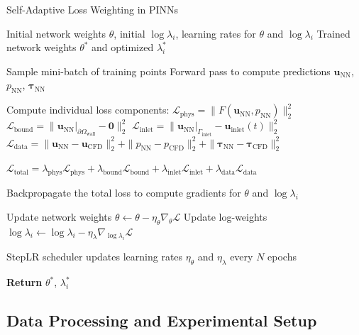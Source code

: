 \documentclass{article}
\begin{document}
\begin{algorithm}[htbp]
    \caption{Self-Adaptive Loss Weighting in PINNs}
    \label{alg:self_adaptive_weighting}
    \begin{algorithmic}[1]
    \Require Initial network weights $\theta$, initial $\log \lambda_i$, learning rates for $\theta$ and $\log \lambda_i$
    \Ensure Trained network weights $\theta^*$ and optimized $\lambda_i^*$
    
        \State Sample mini-batch of training points
        \State Forward pass to compute predictions $\mathbf{u}_{\mathrm{NN}}$, $p_{\mathrm{NN}}$, $\boldsymbol{\tau}_{\mathrm{NN}}$
        
        \State Compute individual loss components:
            \State \quad $\mathcal{L}_{\mathrm{phys}} = \|F(\mathbf{u}_{\mathrm{NN}}, p_{\mathrm{NN}})\|_2^2$
            \State \quad $\mathcal{L}_{\mathrm{bound}} = \|\mathbf{u}_{\mathrm{NN}}|_{\partial\Omega_{\mathrm{wall}}} - \mathbf{0}\|_2^2$
            \State \quad $\mathcal{L}_{\mathrm{inlet}} = \|\mathbf{u}_{\mathrm{NN}}|_{\Gamma_{\mathrm{inlet}}} - \mathbf{u}_{\mathrm{inlet}}(t)\|_2^2$
            \State \quad $\mathcal{L}_{\mathrm{data}} = \|\mathbf{u}_{\mathrm{NN}} - \mathbf{u}_{\mathrm{CFD}}\|_2^2 + \|p_{\mathrm{NN}} - p_{\mathrm{CFD}}\|_2^2 + \|\boldsymbol{\tau}_{\mathrm{NN}} - \boldsymbol{\tau}_{\mathrm{CFD}}\|_2^2$
        
        \State \quad $\mathcal{L}_{\mathrm{total}} = \lambda_{\mathrm{phys}} \mathcal{L}_{\mathrm{phys}} + \lambda_{\mathrm{bound}} \mathcal{L}_{\mathrm{bound}} + \lambda_{\mathrm{inlet}} \mathcal{L}_{\mathrm{inlet}} + \lambda_{\mathrm{data}} \mathcal{L}_{\mathrm{data}}$
        
        \State Backpropagate the total loss to compute gradients for $\theta$ and $\log \lambda_i$
        
        \State Update network weights $\theta \gets \theta - \eta_{\theta} \nabla_{\theta} \mathcal{L}$
        \State Update log-weights $\log \lambda_i \gets \log \lambda_i - \eta_{\lambda} \nabla_{\log \lambda_i} \mathcal{L}$
        
        \State StepLR scheduler updates learning rates $\eta_{\theta}$ and $\eta_{\lambda}$ every $N$ epochs
    \EndWhile
    
    \State \textbf{Return} $\theta^*$, $\lambda_i^*$
    \end{algorithmic}
\end{algorithm}

\subsection{Data Processing and Experimental Setup}
\label{sec:data_processing}
\end{document}

